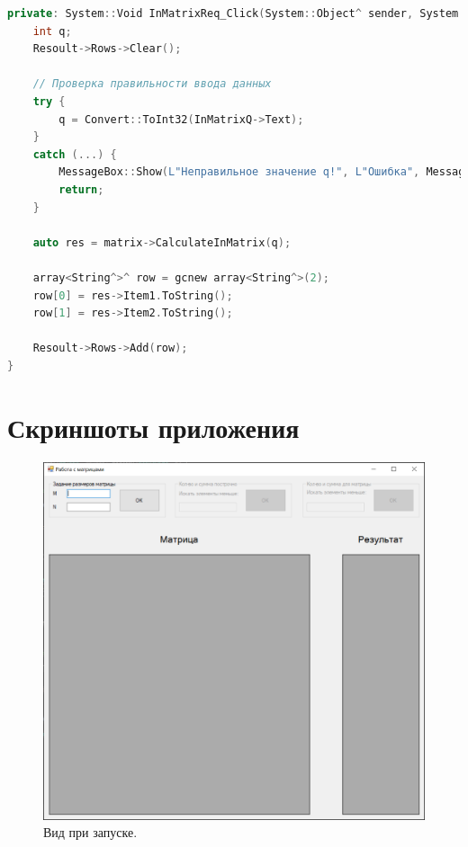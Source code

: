 \documentclass[a4paper,12pt]{article}
\theoremstyle{plain}
\theoremstyle{remark}
\theoremstyle{definition}
\begin{document}
\begin{enumerate}
		\begin{lstlisting}[language=C++]
private: System::Void InMatrixReq_Click(System::Object^ sender, System::EventArgs^ e) {
	int q;
	Resoult->Rows->Clear();
	
	// Проверка правильности ввода данных
	try {
		q = Convert::ToInt32(InMatrixQ->Text);
	}
	catch (...) {
		MessageBox::Show(L"Неправильное значение q!", L"Ошибка", MessageBoxButtons::OK, MessageBoxIcon::Error);
		return;
	}
	
	auto res = matrix->CalculateInMatrix(q);
	
	array<String^>^ row = gcnew array<String^>(2);
	row[0] = res->Item1.ToString();
	row[1] = res->Item2.ToString();
	
	Resoult->Rows->Add(row);
}
		\end{lstlisting}
	\end{enumerate} 
	
	\pagebreak
	\section{Скриншоты приложения}
	
	\begin{figure}[h!]
		\centering
		\includegraphics[width=.9\linewidth]{1.png}
		\caption{Вид при запуске.}
	\end{figure}
	
\end{document}

